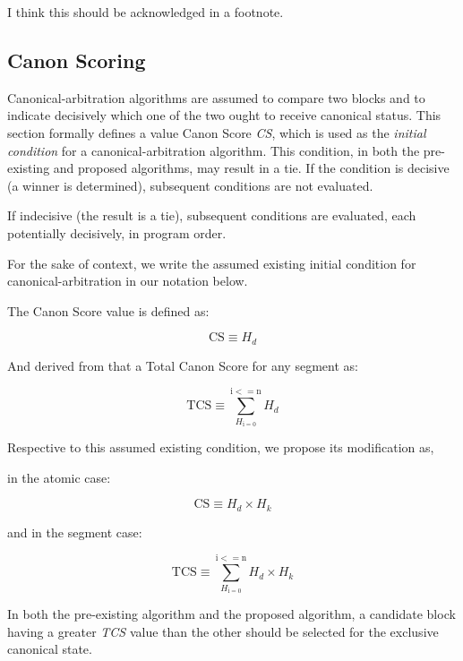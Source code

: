 \documentclass[11pt]{article}
\theoremstyle{plain}
\begin{document}
I think this should be acknowledged in a footnote.

\subsection{\small{Canon Scoring}}\label{sec: S4}

Canonical-arbitration algorithms are assumed to compare two blocks and to
indicate decisively which one of the two ought to receive canonical status.
This section formally defines a value Canon Score \textit{CS}, which is used as
the \textit{initial condition} for a canonical-arbitration algorithm.
This condition, in both the pre-existing and proposed algorithms, may result in
a tie. If the condition is decisive (a winner is determined), subsequent
conditions are not evaluated.

If indecisive (the result is a tie), subsequent conditions are evaluated, each
potentially decisively, in program order.

For the sake of context, we write the assumed existing initial condition for
canonical-arbitration in our notation below.

The Canon Score value is defined as:

\begin{equation}
\mathrm{CS} \equiv H_d
\end{equation}

And derived from that a Total Canon Score for any segment as:

\begin{equation}
\mathrm{TCS} \equiv \sum_{H_\mathrm{i = 0}}^{\mathrm{i <= n}} H_d
\end{equation}

Respective to this assumed existing condition, we propose its modification as,

in the atomic case:

\begin{equation}
\mathrm{CS} \equiv H_d \times H_k
\end{equation}

and in the segment case:

\begin{equation}
\mathrm{TCS} \equiv \sum_{H_\mathrm{i = 0}}^{\mathrm{i <= n}} H_d \times H_k
\end{equation}

In both the pre-existing algorithm and the proposed algorithm, a candidate
block having a greater \textit{TCS} value than the other should be selected for
the exclusive canonical state.
\end{document}
